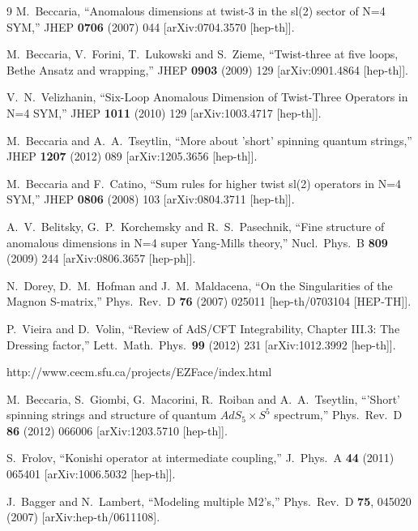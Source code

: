 \documentclass[a4paper,11pt]{article}
\numberwithin{equation}{section}
\begin{document}
\begin{thebibliography} {9}
  M.~Beccaria,
  ``Anomalous dimensions at twist-3 in the sl(2) sector of N=4 SYM,''
  JHEP {\bf 0706} (2007) 044
  [arXiv:0704.3570 [hep-th]].

  M.~Beccaria, V.~Forini, T.~Lukowski and S.~Zieme,
  ``Twist-three at five loops, Bethe Ansatz and wrapping,''
  JHEP {\bf 0903} (2009) 129
  [arXiv:0901.4864 [hep-th]].

  V.~N.~Velizhanin,
  ``Six-Loop Anomalous Dimension of Twist-Three Operators in N=4 SYM,''
  JHEP {\bf 1011} (2010) 129
  [arXiv:1003.4717 [hep-th]].

  M.~Beccaria and A.~A.~Tseytlin,
  ``More about 'short' spinning quantum strings,''
  JHEP {\bf 1207} (2012) 089
  [arXiv:1205.3656 [hep-th]].

  M.~Beccaria and F.~Catino,
  ``Sum rules for higher twist sl(2) operators in N=4 SYM,''
  JHEP {\bf 0806} (2008) 103
  [arXiv:0804.3711 [hep-th]].

  A.~V.~Belitsky, G.~P.~Korchemsky and R.~S.~Pasechnik,
  ``Fine structure of anomalous dimensions in N=4 super Yang-Mills theory,''
  Nucl.\ Phys.\ B {\bf 809} (2009) 244
  [arXiv:0806.3657 [hep-ph]].

  N.~Dorey, D.~M.~Hofman and J.~M.~Maldacena,
  ``On the Singularities of the Magnon S-matrix,''
  Phys.\ Rev.\ D {\bf 76} (2007) 025011
  [hep-th/0703104 [HEP-TH]].

  P.~Vieira and D.~Volin,
  ``Review of AdS/CFT Integrability, Chapter III.3: The Dressing factor,''
  Lett.\ Math.\ Phys.\  {\bf 99} (2012) 231
  [arXiv:1012.3992 [hep-th]].

 http://www.cecm.sfu.ca/projects/EZFace/index.html

  M.~Beccaria, S.~Giombi, G.~Macorini, R.~Roiban and A.~A.~Tseytlin,
  ``'Short' spinning strings and structure of quantum $AdS_5 \times S^5$ spectrum,''
  Phys.\ Rev.\ D {\bf 86} (2012) 066006
  [arXiv:1203.5710 [hep-th]].

  S.~Frolov,
  ``Konishi operator at intermediate coupling,''
  J.\ Phys.\ A {\bf 44} (2011) 065401
  [arXiv:1006.5032 [hep-th]].

  J.~Bagger and N.~Lambert,
  ``Modeling multiple M2's,''
  Phys.\ Rev.\  D {\bf 75}, 045020 (2007)
  [arXiv:hep-th/0611108].


\end{thebibliography}
\end{document}
